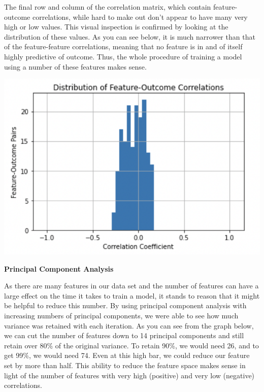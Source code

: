 \documentclass[12pt]{article}
\begin{document}
The final row and column of the correlation matrix, which contain feature-outcome correlations, while hard to make out don't appear to have many very high or low values. This visual inspection is confirmed by looking at the distribution of these values. As you can see below, it is much narrower than that of the feature-feature correlations, meaning that no feature is in and of itself highly predictive of outcome. Thus, the whole procedure of training a model using a number of these features makes sense.

\includegraphics[scale=1.2]{feat_outcome_correlations.jpg}

\textbf{Principal Component Analysis}

As there are many features in our data set and the number of features can have a large effect on the time it takes to train a model, it stands to reason that it might be helpful to reduce this number. By using principal component analysis with increasing numbers of principal components, we were able to see how much variance was retained with each iteration. As you can see from the graph below, we can cut the number of features down to 14 principal components and still retain over 80\% of the original variance. To retain 90\%, we would need 26, and to get 99\%, we would need 74. Even at this high bar, we could reduce our feature set by more than half. This ability to reduce the feature space makes sense in light of the number of features with very high (positive) and very low (negative) correlations.
\end{document}
